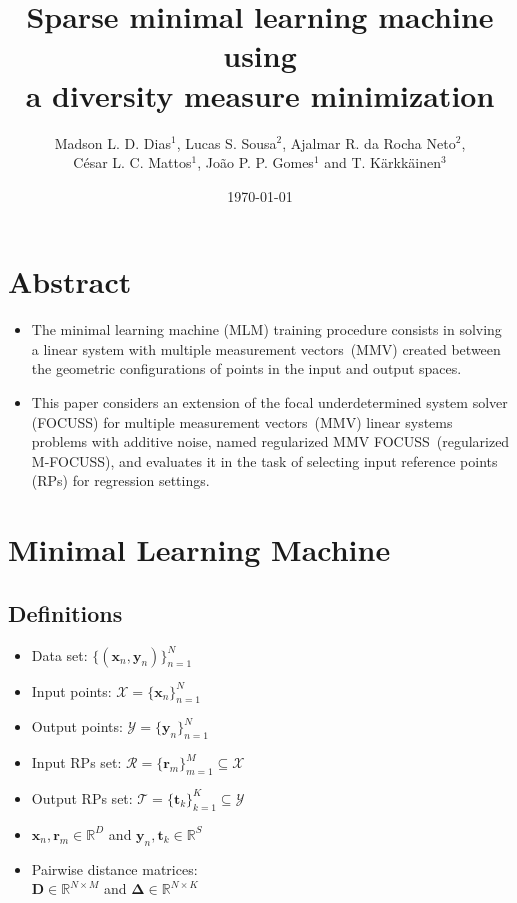 \documentclass[final]{beamer}
\title
[ESANN, 25 - 27 April 2019, Bruges, Belgium] %
{ %
Sparse minimal learning machine using\\a diversity measure minimization
}
\author{ %
Madson L. D. Dias$^1$, Lucas S. Sousa$^2$, Ajalmar R. da Rocha Neto$^2$,\\César L. C. Mattos$^1$, João P. P. Gomes$^1$ and T. Kärkkäinen$^3$
}
\institute{1. Federal University of Ceará, Brazil ~
2. Federal Institute of Ceará, Brazil ~
3. University of Jyvaskyla, Finland\\
\texttt{madson.dias@lia.ufc.br},
\texttt{lucas.sousa@ppgcc.ifce.edu.br},
\texttt{ajalmar@ifce.edu.br},\\
\texttt{cesarlincoln@dc.ufc.br},
\texttt{jpaulo@lia.ufc.br},
\texttt{tommi.karkkainen@jyu.fi}
}
\date{\today}
\renewcommand{\vec}{\boldsymbol}
\begin{document}
\begin{frame}[t]
\begin{multicols}{3}

\section{Abstract}

\begin{itemize}
\item The minimal learning machine (MLM) training procedure consists in solving a linear system with multiple measurement vectors~(MMV) created between the geometric configurations of points in the input and output spaces. 

\item This paper considers an extension of the focal underdetermined system solver (FOCUSS) for multiple measurement vectors~(MMV) linear systems problems with additive noise, named regularized MMV FOCUSS~(regularized M-FOCUSS), and evaluates it in the task of selecting input reference points (RPs) for regression settings.
\end{itemize}


\section{Minimal Learning Machine~\cite{souza2015}}


\subsection{Definitions}

\begin{itemize}
	\item Data set: $\{(\vec{x}_n, \vec{y}_n)\}_{n=1}^N$
	\item Input points: $\mathcal{X}=\{\vec{x}_n\}_{n=1}^N$ 
	\item Output points: $\mathcal{Y}=\{\vec{y}_n\}_{n=1}^N$ 
    \item Input RPs set: $\mathcal{R} = \{\vec{r}_m\}_{m=1}^M \subseteq \mathcal{X}$
    \item Output RPs set: $\mathcal{T} = \{\vec{t}_k\}_{k=1}^K \subseteq \mathcal{Y}$
    \item[] $\vec{x}_n, \vec{r}_m \in \mathbb{R}^D$ and $\vec{y}_n, \vec{t}_k \in \mathbb{R}^S$
    \item Pairwise distance matrices:\\ $\mathbf{D} \in \mathbb{R}^{N \times M}$ and $\mathbf{\Delta} \in \mathbb{R}^{N \times K}$


\end{itemize}
\end{multicols}
\end{frame}
\end{document}
